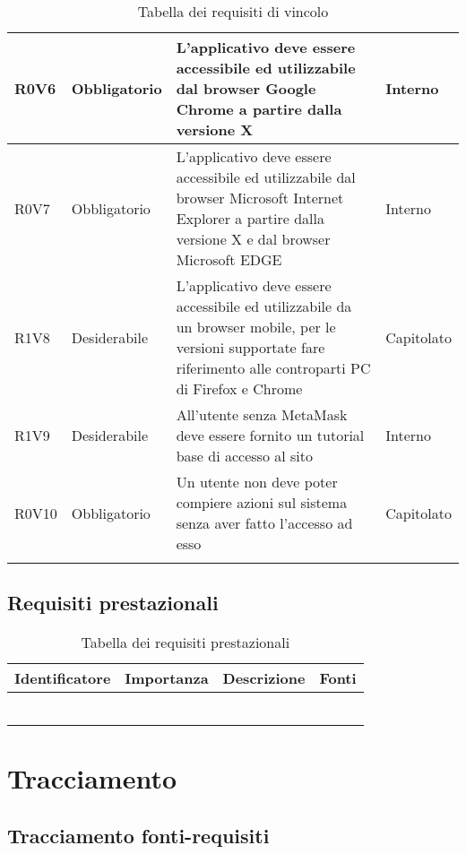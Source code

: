 \documentclass[AnalisiDeiRequisiti.tex]{subfiles}
\begin{document}
\begin{longtable}[H]{|p{2.5cm}|p{2.5cm}|p{5cm}|p{2cm}|}
	R0V6 & Obbligatorio & L'applicativo deve essere accessibile ed utilizzabile dal browser Google Chrome a partire dalla versione X & Interno \\ \hline %
	R0V7 & Obbligatorio & L'applicativo deve essere accessibile ed utilizzabile dal browser Microsoft Internet Explorer a partire dalla versione X e dal browser Microsoft EDGE & Interno \\ \hline %
	R1V8 & Desiderabile & L'applicativo deve essere accessibile ed utilizzabile da un browser mobile, per le versioni supportate fare riferimento alle controparti PC di Firefox e Chrome & Capitolato \\ \hline %
	R1V9 & Desiderabile & All'utente senza MetaMask deve essere fornito un tutorial base di accesso al sito & Interno \\ \hline %
	R0V10 & Obbligatorio & Un utente non deve poter compiere azioni sul sistema senza aver fatto l'accesso ad esso & Capitolato \\ \hline
	\caption{Tabella dei requisiti di vincolo}
\end{longtable}

\subsection{Requisiti prestazionali}

\label{table:Tabella requisiti prestazionali}
\begin{longtable}[H]{|p{2.5cm}|p{2.5cm}|p{5cm}|p{2cm}|}
	\hline
	\rowcolor[HTML]{38FFF8} 
	\textbf{Identificatore} & \textbf{Importanza} & \textbf{Descrizione} & \textbf{Fonti} \\ \hline
	\endhead
	&  &  &  \\ \hline
	&  &  &  \\ \hline
	&  &  &  \\ \hline
	&  &  &  \\ \hline
	&  &  &  \\ \hline
	\caption{Tabella dei requisiti prestazionali}
\end{longtable}

\section{Tracciamento}
\subsection{Tracciamento fonti-requisiti}
\end{document}
